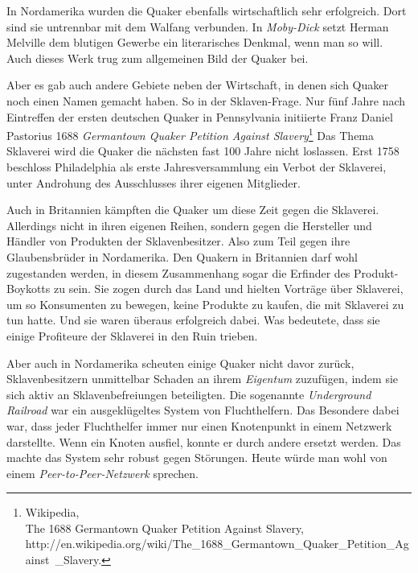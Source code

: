 \medskip

In Nordamerika wurden die Quaker ebenfalls wirtschaftlich sehr erfolgreich. Dort
sind sie untrennbar mit dem Walfang verbunden. In
\textit{Moby-Dick} setzt
Herman Melville dem blutigen Gewerbe ein
literarisches Denkmal, wenn man so
will. Auch dieses Werk trug zum allgemeinen Bild der Quaker bei.

\medskip

Aber es gab auch andere Gebiete neben der Wirtschaft, in denen sich Quaker noch
einen
Namen gemacht haben. So in der Sklaven-Frage. Nur fünf Jahre
nach Eintreffen
der ersten deutschen Quaker in Pennsylvania initiierte Franz Daniel Pastorius
1688 \textit{Germantown Quaker Petition Against Slavery}\footnote{Wikipedia,
\\The 1688 Germantown Quaker Petition Against Slavery,
\\http://en.wikipedia.org/wiki/The\_1688\_Germantown\_Quaker\_Petition\_Against\
\_Slavery.} Das Thema Sklaverei wird die Quaker die nächsten fast 100 Jahre
nicht
loslassen. Erst 1758 beschloss Philadelphia als erste
Jahresversammlung ein Verbot der Sklaverei,
unter Androhung des Ausschlusses ihrer eigenen Mitglieder.

\medskip

Auch in Britannien kämpften die Quaker um diese Zeit gegen die Sklaverei.
Allerdings nicht in ihren eigenen Reihen, sondern gegen die Hersteller
und Händler von Produkten der Sklavenbesitzer. Also zum Teil gegen ihre
Glaubensbrüder in Nordamerika. Den Quakern in Britannien darf wohl zugestanden
werden, in diesem Zusammenhang sogar die Erfinder des Produkt-Boykotts
\index{Boykott} zu sein.
Sie zogen durch das Land und hielten Vorträge über Sklaverei, um so Konsumenten
zu
bewegen, keine Produkte zu kaufen, die mit Sklaverei zu tun hatte. Und sie
waren überaus erfolgreich dabei. Was bedeutete, dass sie einige Profiteure der
Sklaverei in den Ruin trieben.

\medskip

Aber auch in Nordamerika scheuten einige Quaker nicht
davor zurück,
Sklavenbesitzern unmittelbar Schaden an ihrem \textit{Eigentum} zuzufügen, indem
sie sich
aktiv an Sklavenbefreiungen beteiligten. Die sogenannte
\textit{Underground Railroad} war ein
ausgeklügeltes System von Fluchthelfern. Das
Besondere dabei war, dass jeder Fluchthelfer
immer
nur einen Knotenpunkt in einem
Netzwerk darstellte. Wenn ein Knoten ausfiel, konnte er durch andere ersetzt
werden. Das machte das System sehr robust gegen Störungen. Heute würde man
wohl
von einem \textit{Peer-to-Peer-Netzwerk} sprechen.

